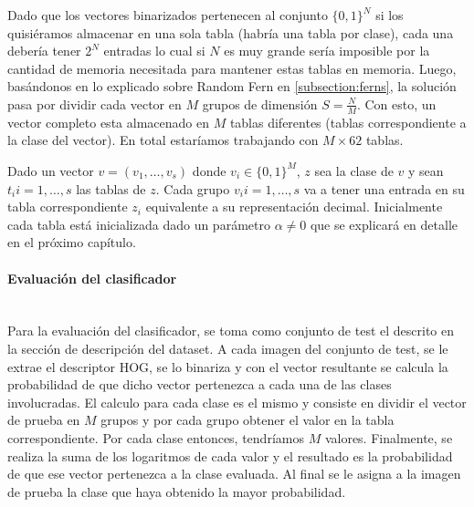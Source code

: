			Dado que los vectores binarizados pertenecen al conjunto $\{ 0,1 \}^{N}$ si los quisiéramos almacenar en una sola tabla (habría una tabla por clase), cada una debería tener $2^{N}$ entradas lo cual si $N$ es muy grande sería imposible por la cantidad de memoria necesitada para mantener estas tablas en memoria. Luego, basándonos en lo explicado sobre Random Fern en \ref{subsection:ferns}, la solución pasa por dividir cada vector en $M$ grupos de dimensión $S = \frac{N}{M}$. Con esto, un vector completo esta almacenado en $M$ tablas diferentes (tablas correspondiente a la clase del vector). En total estaríamos trabajando con $M \times 62$ tablas.

			Dado un vector $v=(v_1, \dots, v_s)$ donde $v_i \in \{ 0,1 \}^{M}$, $z$ sea la clase de $v$ y sean $t_i i=1, \dots, s$ las tablas de $z$. Cada grupo $v_i i=1, \dots, s$ va a tener una entrada en su tabla correspondiente $z_i$ equivalente a su representación decimal. Inicialmente cada tabla está inicializada dado un parámetro $\alpha \neq 0$ que se explicará en detalle en el próximo capítulo.

		\paragraph{Evaluación del clasificador} ~\\

			Para la evaluación del clasificador, se toma como conjunto de test el descrito en la sección de descripción del dataset. A cada imagen del conjunto de test, se le extrae el descriptor HOG, se lo binariza y con el vector resultante se calcula la probabilidad de que dicho vector pertenezca a cada una de las clases involucradas. El calculo para cada clase es el mismo y consiste en dividir el vector de prueba en $M$ grupos y por cada grupo obtener el valor en la tabla correspondiente. Por cada clase entonces, tendríamos $M$ valores. Finalmente, se realiza la suma de los logaritmos de cada valor y el resultado es la probabilidad de que ese vector pertenezca a la clase evaluada. Al final se le asigna a la imagen de prueba la clase que haya obtenido la mayor probabilidad.

